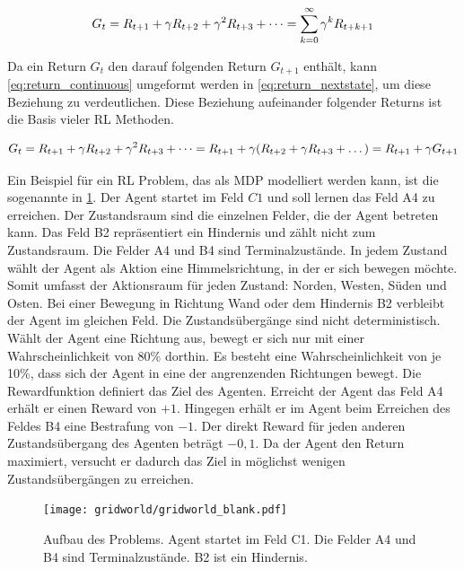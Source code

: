 \begin{equation}
    \label{eq:return_continuous}
    \equationentry{Berechnung Return $G_t$ für Probleme unendlicher Zeitdauer}
    G_t=R_{t+1}+\gamma R_{t+2}+\gamma^2R_{t+3} + \dots =\sum_{k=0}^{\infty}\gamma^{k}R_{t+k+1}
\end{equation}

Da ein Return $G_t$ den darauf folgenden Return $G_{t+1}$ enthält, kann \cref{eq:return_continuous} umgeformt werden in \cref{eq:return_nextstate}, um diese Beziehung zu verdeutlichen. Diese Beziehung aufeinander folgender Returns ist die Basis vieler \ac{RL} Methoden. \cite[S. 54 f.]{suttonReinforcementLearningIntroduction2018}

\begin{equation}
    \label{eq:return_nextstate}
    \equationentry{Beziehung aufeinander folgender Returns}
     G_t= R_{t+1}+\gamma R_{t+2}+\gamma^2R_{t+3} +\dots = R_{t+1}+\gamma(R_{t+2}+\gamma R_{t+3} +  \dots) = R_{t+1}+\gamma G_{t+1}
\end{equation}

 
Ein Beispiel für ein \ac{RL} Problem, das als \ac{MDP} modelliert werden kann, ist die sogenannte  in \cref{fig:gridworld_blank}. 
Der Agent startet im Feld $C1$ und soll lernen das Feld A4 zu erreichen. 
Der Zustandsraum sind die einzelnen Felder, die der Agent betreten kann. 
Das Feld B2 repräsentiert ein Hindernis und zählt nicht zum Zustandsraum. 
Die Felder A4 und B4 sind Terminalzustände. 
In jedem Zustand wählt der Agent als Aktion eine Himmelsrichtung, in der er sich bewegen möchte. Somit umfasst der Aktionsraum für jeden Zustand: Norden, Westen, Süden und Osten. 
Bei einer Bewegung in Richtung Wand oder dem Hindernis B2 verbleibt der Agent im gleichen Feld. 
Die Zustandsübergänge sind nicht deterministisch. 
Wählt der Agent eine Richtung aus, bewegt er sich nur mit einer Wahrscheinlichkeit von 80\% dorthin. 
Es besteht eine Wahrscheinlichkeit von je 10\%, dass sich der Agent in eine der angrenzenden Richtungen bewegt. 
Die Rewardfunktion definiert das Ziel des Agenten. 
Erreicht der Agent das Feld A4 erhält er einen Reward von $+1$. 
Hingegen erhält er im Agent beim Erreichen des Feldes B4 eine Bestrafung von $-1$. 
Der direkt Reward für jeden anderen Zustandsübergang des Agenten beträgt $-0,1$.
Da der Agent den Return maximiert, versucht er dadurch das Ziel in möglichst wenigen Zustandsübergängen zu erreichen. \cite[S. 10 ff.]{kontesg.SeminarReinforcementLearning2021}

\begin{figure}
    \centering
    \texttt{[image: gridworld/gridworld\_blank.pdf]}
    \caption[Aufbau des  Problems]{Aufbau des  Problems. Agent startet im Feld C1. Die Felder A4 und B4 sind Terminalzustände. B2 ist ein Hindernis.\protect\footnotemark}
    \label{fig:gridworld_blank}
\end{figure}

